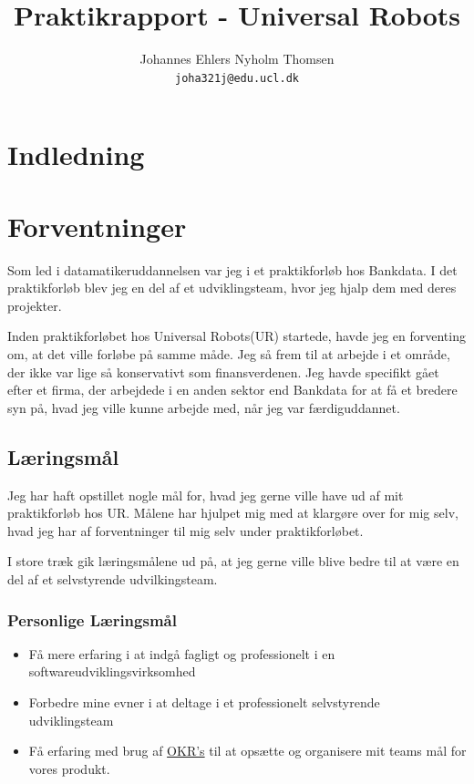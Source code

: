 \documentclass[a4paper]{article}
\title{Praktikrapport - Universal Robots}
\author
{
    Johannes Ehlers Nyholm Thomsen\\ 
    \texttt{joha321j@edu.ucl.dk}
}
\begin{document}
\maketitle

\newpage

\tableofcontents

\newpage

\section{Indledning}

\section{Forventninger}
Som led i datamatikeruddannelsen var jeg i et praktikforløb hos Bankdata.
I det praktikforløb blev jeg en del af et udviklingsteam,
hvor jeg hjalp dem med deres projekter.

Inden praktikforløbet hos Universal Robots(UR) startede, havde jeg en forventing om,
at det ville forløbe på samme måde.
Jeg så frem til at arbejde i et område,
der ikke var lige så konservativt som finansverdenen.
Jeg havde specifikt gået efter et firma,
der arbejdede i en anden sektor end Bankdata for at få et bredere syn på,
hvad jeg ville kunne arbejde med, når jeg var færdiguddannet.

\subsection{Læringsmål}
Jeg har haft opstillet nogle mål for, 
hvad jeg gerne ville have ud af mit praktikforløb hos UR.
Målene har hjulpet mig med at klargøre over for mig selv,
hvad jeg har af forventninger til mig selv under praktikforløbet.

I store træk gik læringsmålene ud på, 
at jeg gerne ville blive bedre til at være en del af et selvstyrende
udvilkingsteam.

\subsubsection*{Personlige Læringsmål}
\begin{itemize}
    \item Få mere erfaring i at indgå fagligt og professionelt i en 
    softwareudviklingsvirksomhed
    \item Forbedre mine evner i at deltage i et professionelt selvstyrende 
    udviklingsteam
    \item Få erfaring med brug af \href{https://en.wikipedia.org/wiki/OKR}{OKR's}
     til at opsætte og organisere mit teams mål for vores produkt.
\end{itemize}
\end{document}
